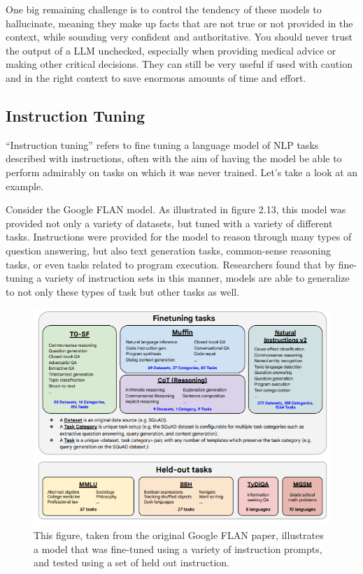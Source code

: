 One big remaining challenge is to control the tendency of these models to hallucinate, meaning they make up facts that are not true or not provided in the context, while sounding very confident and authoritative.
You should never trust the output of a LLM unchecked, especially when providing medical advice or making other critical decisions.
They can still be very useful if used with caution and in the right context to save enormous amounts of time and effort.

\subsection{Instruction Tuning}

“Instruction tuning” refers to fine tuning a language model of NLP tasks described with instructions, often with the aim of having the model
be able to perform admirably on tasks on which it was never trained. Let's take a look at an example.

Consider the Google FLAN\cite{chung2022scaling} model. As illustrated in figure 2.13, this model was provided not only a variety of datasets, but
tuned with a variety of different tasks. Instructions were provided for the model to reason through many types of question answering, but also text
generation tasks, common-sense reasoning tasks, or even tasks related to program execution. Researchers found that by fine-tuning a variety of instruction
sets in this manner, models are able to generalize to not only these types of task but other tasks as well.

\begin{figure}
  \includegraphics[width=\linewidth]{chapters/NLP/figures/flan_finetune.png}
  \caption{This figure, taken from the original Google FLAN paper, illustrates a model that was fine-tuned using a variety of instruction prompts, and tested using a set of held out instruction.}
  \label{fig:flan_instruction_fine_tuning}
\end{figure}

